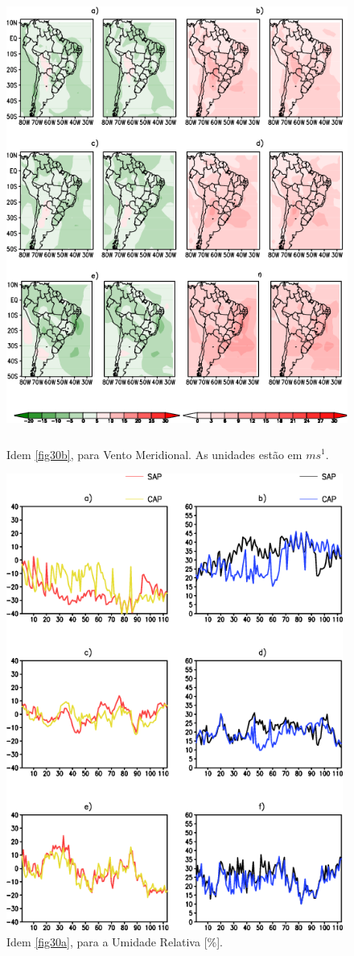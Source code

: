 \begin{figure}[!hbp]
\centering
\includegraphics[height=15cm]{./figs/campo_vies_eqm-vvel.png}
\caption{Idem \autoref{fig30b}, para Vento Meridional. As unidades estão em $ms^{1}$.}
\label{fig33b}
\end{figure}



\begin{figure}[!hbp]
\centering
\includegraphics[height=15cm]{./figs/vies_eqm-umrl.png}
\caption{Idem \autoref{fig30a}, para a Umidade Relativa [\%].}
\label{fig34a}
\end{figure}

